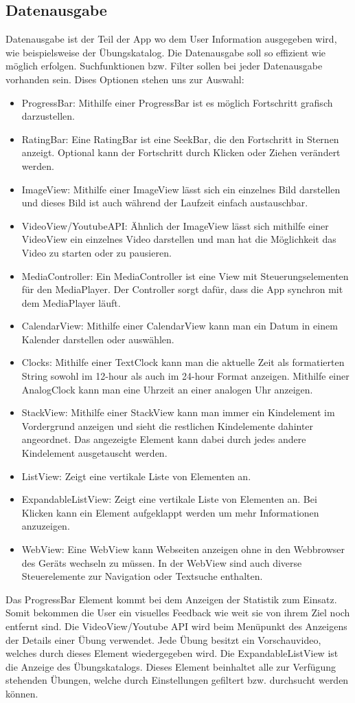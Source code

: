 \documentclass[FIPLY_base.tex]{subfiles}
\begin{document}
\subsection{Datenausgabe}
Datenausgabe ist der Teil der App wo dem User Information ausgegeben wird, wie beispielsweise der Übungskatalog.
Die Datenausgabe soll so effizient wie möglich erfolgen. Suchfunktionen bzw. Filter sollen bei jeder Datenausgabe vorhanden sein.
Dises Optionen stehen uns zur Auswahl:
\begin{itemize}
	\item ProgressBar: Mithilfe einer ProgressBar ist es möglich Fortschritt grafisch darzustellen. 
	\item RatingBar: Eine RatingBar ist eine SeekBar, die den Fortschritt in Sternen anzeigt. Optional kann der Fortschritt durch Klicken oder Ziehen verändert werden.
	\item ImageView: Mithilfe einer ImageView lässt sich ein einzelnes Bild darstellen und dieses Bild ist auch während der Laufzeit einfach austauschbar.
	\item VideoView/YoutubeAPI: Ähnlich der ImageView lässt sich mithilfe einer VideoView ein	einzelnes Video darstellen und man hat die Möglichkeit das Video zu starten oder zu pausieren.  
	\item MediaController: Ein MediaController ist eine View mit Steuerungselementen für den 
	MediaPlayer. Der Controller sorgt dafür, dass die App synchron mit 
	dem MediaPlayer läuft.
	\item CalendarView: Mithilfe einer CalendarView kann man ein Datum in einem Kalender darstellen oder auswählen.
	\item Clocks: Mithilfe einer TextClock kann man die aktuelle Zeit als formatierten String sowohl im 12-hour als auch im 24-hour Format anzeigen. Mithilfe einer AnalogClock kann man eine Uhrzeit an einer analogen Uhr anzeigen.
	\item StackView: Mithilfe einer StackView kann man immer ein Kindelement im Vordergrund anzeigen und sieht die restlichen Kindelemente dahinter angeordnet. Das angezeigte Element kann dabei durch jedes andere Kindelement ausgetauscht werden.
	\item ListView: Zeigt eine vertikale Liste von Elementen an.
	\item ExpandableListView: Zeigt eine vertikale Liste von Elementen an. Bei Klicken kann ein Element aufgeklappt werden um mehr Informationen anzuzeigen.
	\item WebView: Eine WebView kann Webseiten anzeigen ohne in den Webbrowser des Geräts wechseln zu müssen. In der WebView sind auch diverse Steuerelemente zur Navigation oder Textsuche enthalten.
\end{itemize}
Das ProgressBar Element kommt bei dem Anzeigen der Statistik zum Einsatz. Somit bekommen die User ein visuelles Feedback wie weit sie von ihrem Ziel noch entfernt sind. Die VideoView/Youtube API wird beim Menüpunkt des Anzeigens der Details einer Übung verwendet. Jede Übung besitzt ein Vorschauvideo, welches durch dieses Element wiedergegeben wird. Die ExpandableListView ist die Anzeige des Übungskatalogs. Dieses Element beinhaltet alle zur Verfügung stehenden Übungen, welche durch Einstellungen gefiltert bzw. durchsucht werden können.
 
\end{document}
